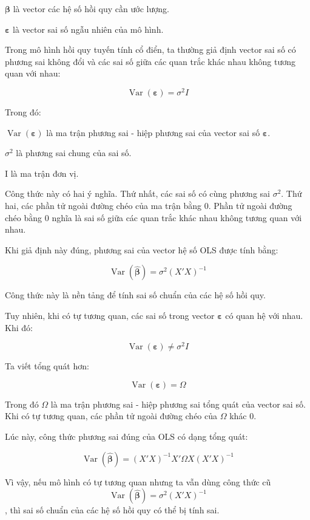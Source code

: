 \documentclass[12pt,a4paper]{article}
\begin{document}
\(\boldsymbol{\beta}\) là vector các hệ số hồi quy cần ước lượng.

\(\boldsymbol{\varepsilon}\) là vector sai số ngẫu nhiên của mô hình.

Trong mô hình hồi quy tuyến tính cổ điển, ta thường giả định vector sai
số có phương sai không đổi và các sai số giữa các quan trắc khác nhau
không tương quan với nhau:

\[
\operatorname{Var}(\boldsymbol{\varepsilon}) = \sigma^2 I
\]

Trong đó:

\(\operatorname{Var}(\boldsymbol{\varepsilon})\) là ma trận phương sai - hiệp phương sai của vector sai số \(\boldsymbol{\varepsilon}\).

\(\sigma^2\) là phương sai chung của sai số.

I là ma trận đơn vị.

Công thức này có hai ý nghĩa. Thứ nhất, các sai số có cùng phương sai
\(\sigma^2\). Thứ hai, các phần tử ngoài đường chéo của ma trận bằng 0. Phần tử
ngoài đường chéo bằng 0 nghĩa là sai số giữa các quan trắc khác nhau
không tương quan với nhau.

Khi giả định này đúng, phương sai của vector hệ số OLS được tính bằng:

\[
\operatorname{Var}(\hat{\boldsymbol{\beta}})=\sigma^2(X'X)^{-1}
\]

Công thức này là nền tảng để tính sai số chuẩn của các hệ số hồi quy.

Tuy nhiên, khi có tự tương quan, các sai số trong vector \(\boldsymbol{\varepsilon}\) có quan hệ
với nhau. Khi đó:

\[
\operatorname{Var}(\boldsymbol{\varepsilon})\neq \sigma^2 I
\]

Ta viết tổng quát hơn:

\[
\operatorname{Var}(\boldsymbol{\varepsilon}) = \Omega
\]

Trong đó \(\Omega\) là ma trận phương sai - hiệp phương sai tổng quát của vector
sai số. Khi có tự tương quan, các phần tử ngoài đường chéo của \(\Omega\) khác 0.

Lúc này, công thức phương sai đúng của OLS có dạng tổng quát:

\[
\operatorname{Var}(\hat{\boldsymbol{\beta}})=(X'X)^{-1}X'\Omega X(X'X)^{-1}
\]

Vì vậy, nếu mô hình có tự tương quan nhưng ta vẫn dùng công thức cũ
\[
\operatorname{Var}(\hat{\boldsymbol{\beta}})=\sigma^2(X'X)^{-1}
\], thì sai số chuẩn của các hệ số hồi quy có thể bị
tính sai.
\end{document}
